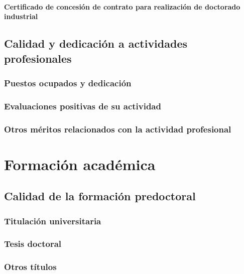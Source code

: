 \documentclass[a4paper, 11pt, twoside, openright]{report}
\begin{document}
\subsubsection{Certificado de concesión de contrato para realización de doctorado industrial}



\section{Calidad y dedicación a actividades profesionales}

\subsection{Puestos ocupados y dedicación}

\subsection{Evaluaciones positivas de su actividad}

\subsection{Otros méritos relacionados con la actividad profesional}

\chapter{Formación académica}



\section{Calidad de la formación predoctoral}

\subsection{Titulación universitaria}



\subsection{Tesis doctoral}



\subsection{Otros títulos}
\end{document}
